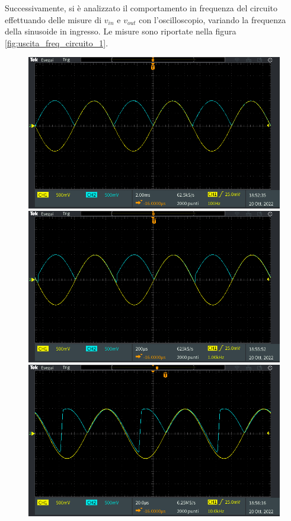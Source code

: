 \noindent
Successivamente, si è analizzato il comportamento in frequenza del circuito effettuando delle misure di $v_{in}$ e $v_{out}$ con l'oscilloscopio, variando la frequenza della sinusoide in ingresso. Le misure sono riportate nella figura \ref{fig:uscita_freq_circuito_1}.
\begin{figure}[h]
	\centering
	\begin{minipage}{.496\textwidth}
		\includegraphics[width=\linewidth]{./ImageFiles/Laboratorio 3/TEK00001.PNG}
	\end{minipage}
	\begin{minipage}{.496\textwidth}
		\includegraphics[width=\linewidth]{./ImageFiles/Laboratorio 3/TEK00003.PNG}
	\end{minipage}
	\begin{minipage}{.496\textwidth}
		\includegraphics[width=\linewidth]{./ImageFiles/Laboratorio 3/TEK00004.PNG}

\end{minipage}
\end{figure}
